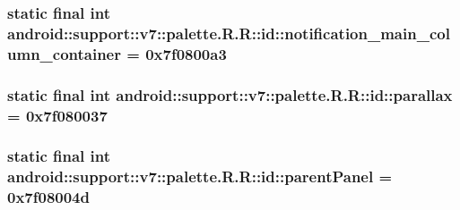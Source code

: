 \hypertarget{classandroid_1_1support_1_1v7_1_1palette_1_1_r_1_1id_6660885642124d0f529fda89966128f7}{
\subsubsection[{notification\_\-main\_\-column\_\-container}]{\setlength{\rightskip}{0pt plus 5cm}static final int android::support::v7::palette.R.R::id::notification\_\-main\_\-column\_\-container = 0x7f0800a3}}
\label{classandroid_1_1support_1_1v7_1_1palette_1_1_r_1_1id_6660885642124d0f529fda89966128f7}


\hypertarget{classandroid_1_1support_1_1v7_1_1palette_1_1_r_1_1id_e229d63b22a00d98afcbb7d2d26ed552}{
\subsubsection[{parallax}]{\setlength{\rightskip}{0pt plus 5cm}static final int android::support::v7::palette.R.R::id::parallax = 0x7f080037}}
\label{classandroid_1_1support_1_1v7_1_1palette_1_1_r_1_1id_e229d63b22a00d98afcbb7d2d26ed552}


\hypertarget{classandroid_1_1support_1_1v7_1_1palette_1_1_r_1_1id_3b878bdb189525595abfe4efbef2507b}{
\subsubsection[{parentPanel}]{\setlength{\rightskip}{0pt plus 5cm}static final int android::support::v7::palette.R.R::id::parentPanel = 0x7f08004d}}
\label{classandroid_1_1support_1_1v7_1_1palette_1_1_r_1_1id_3b878bdb189525595abfe4efbef2507b}


